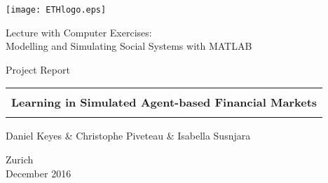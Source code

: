 
\thispagestyle{empty}

\begin{center}
\texttt{[image: ETHlogo.eps]}

\bigskip


\bigskip


\bigskip


\LARGE{ 	Lecture with Computer Exercises:\\ }
\LARGE{ Modelling and Simulating Social Systems with MATLAB\\}

\bigskip

\bigskip

\small{Project Report}\\

\bigskip

\bigskip

\bigskip

\bigskip


\begin{tabular}{|c|}
\hline
\\
\textbf{\LARGE{Learning in Simulated Agent-based Financial Markets}}\\
\\
\hline
\end{tabular}
\bigskip

\bigskip

\bigskip

\LARGE{Daniel Keyes \& Christophe Piveteau \& Isabella Susnjara}


\bigskip

\bigskip

\bigskip

\bigskip

\bigskip

\bigskip

\bigskip

\bigskip

Zurich\\
December 2016\\

\end{center}


